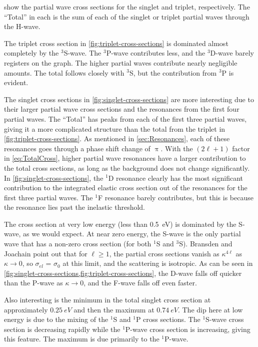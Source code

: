 \documentclass[Dissertation.tex]{subfiles}
\begin{document}
 show the partial
wave cross sections for the singlet and triplet, respectively. The ``Total''
in each is the sum of each of the singlet or triplet partial waves through the
H-wave.

The triplet cross section in \cref{fig:triplet-cross-sections} is dominated 
almost completely by the $^3$S-wave. The $^3$P-wave 
contributes less, and the $^3$D-wave barely registers on the graph. The 
higher partial waves contribute nearly negligible amounts. The total follows
closely with $^3$S, but the contribution from $^3$P is evident.

The singlet cross sections in \cref{fig:singlet-cross-sections} are more
interesting due to their larger partial wave cross sections and the resonances
from the first four partial waves. The ``Total'' has peaks from each of the
first three partial waves, giving it a more complicated structure than the
total from the triplet in \cref{fig:triplet-cross-sections}. As mentioned
in \cref{sec:Resonances}, each of these resonances goes through a phase shift
change of $\uppi$. With the $(2\ell+1)$ factor in \cref{eq:TotalCross},
higher partial wave resonances have a larger contribution to the total
cross sections, as long as the background does not change significantly.
In \cref{fig:singlet-cross-sections}, the $^1$D resonance clearly has the
most significant contribution to the integrated elastic cross section out of
the resonances for the first three partial waves. The $^1$F resonance barely
contributes, but this is because the resonance lies past the inelastic 
threshold.

The cross section at very low energy (less than \SI{0.5}{eV}) is dominated
by the S-wave, as we would expect. At near zero energy, the S-wave is the
only partial wave that has a non-zero cross section (for both $^1$S and $^3$S).
Bransden and Joachain \cite{Bransden2003} point out that for $\ell \geq 1$,
the partial cross sections vanish as $\kappa^{4\ell}$ as $\kappa \to 0$, so
$\sigma_{el}$ = $\sigma_0$ at this limit, and the scattering is isotropic.
As can be seen in \cref{fig:singlet-cross-sections,fig:triplet-cross-sections},
the D-wave falls off quicker than the P-wave as $\kappa \to 0$, and the F-wave
falls off even faster.

Also interesting is the minimum in the total singlet cross section at 
approximately $\SI{0.25}{eV}$ and then the maximum at $\SI{0.74}{eV}$. The dip
here at low energy is due to the mixing of the $^1$S and $^1$P cross sections.
The $^1$S-wave cross section is decreasing rapidly while the $^1$P-wave cross
section is increasing, giving this feature. The maximum is due primarily to the
$^1$P-wave.
\end{document}
